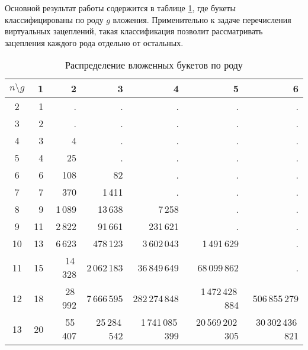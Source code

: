 \documentclass[a4paper,12pt]{article}
\theoremstyle{plain}
\theoremstyle{definition}
\begin{document}
Основной результат работы содержится в таблице \ref{table:by-genus}, где букеты классифицированы по роду $g$ вложения.
Применительно к задаче перечисления виртуальных зацеплений, такая классификация позволит рассматривать зацепления каждого рода
отдельно от остальных.
\begin{table}[!t]\footnotesize
\caption{\small Распределение вложенных букетов по роду\label{table:by-genus}} \centering
\begin{tabular}{|c||r|r|r|r|r|r|}
\hline
$n \setminus g$
   &  1 &       2 &            3 &                4 &                 5 &                 6 \\
\hline\hline
2  &  1 &       . &            . &                . &                 . &                 . \\
3  &  2 &       . &            . &                . &                 . &                 . \\
4  &  3 &       4 &            . &                . &                 . &                 . \\
5  &  4 &      25 &            . &                . &                 . &                 . \\
6  &  6 &     108 &           82 &                . &                 . &                 . \\
7  &  7 &     370 &       1\,411 &                . &                 . &                 . \\
8  &  9 &  1\,089 &      13\,638 &           7\,258 &                 . &                 . \\
9  & 11 &  2\,822 &      91\,661 &         231\,621 &                 . &                 . \\
10 & 13 &  6\,623 &     478\,123 &      3\,602\,043 &       1\,491\,629 &                 . \\
11 & 15 & 14\,328 &  2\,062\,183 &     36\,849\,649 &      68\,099\,862 &                 . \\
12 & 18 & 28\,992 &  7\,666\,595 &    282\,274\,848 &  1\,472\,428\,884 &     506\,855\,279 \\
13 & 20 & 55\,407 & 25\,284\,542 & 1\,741\,085\,399 & 20\,569\,202\,305 & 30\,302\,436\,821 \\
\hline
\end{tabular}
\end{table}
\end{document}
